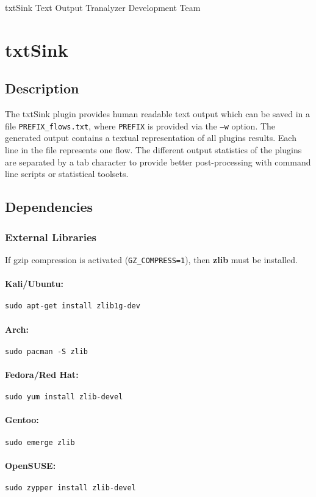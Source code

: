 \documentclass[documentation]{subfiles}
\begin{document}
\trantitle
    {txtSink}
    {Text Output}
    {Tranalyzer Development Team} %

\section{txtSink}\label{s:txtSink}

\subsection{Description}
The txtSink plugin provides human readable text output which can be saved in a file {\tt PREFIX\_flows.txt}, where {\tt PREFIX} is provided via the {\tt --w} option. The generated output contains a textual representation of all plugins results. Each line in the file represents one flow. The different output statistics of the plugins are separated by a tab character to provide better post-processing with command line scripts or statistical toolsets.

\subsection{Dependencies}

\subsubsection{External Libraries}
If gzip compression is activated ({\tt GZ\_COMPRESS=1}), then {\bf zlib} must be installed.

\paragraph{Kali/Ubuntu:} {\tt sudo apt-get install zlib1g-dev}
\paragraph{Arch:} {\tt sudo pacman -S zlib}
\paragraph{Fedora/Red Hat:} {\tt sudo yum install zlib-devel}
\paragraph{Gentoo:} {\tt sudo emerge zlib}
\paragraph{OpenSUSE:} {\tt sudo zypper install zlib-devel}
\end{document}
